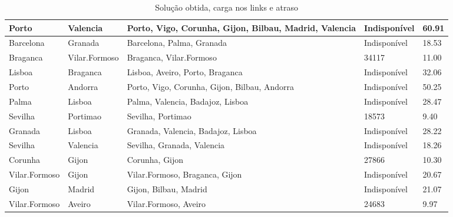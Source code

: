 \begin{table}[!htb]
{\begin{tabular}{|l|l|l|l|l|}
Porto & Valencia & Porto, Vigo, Corunha, Gijon, Bilbau, Madrid, Valencia & Indisponível & 60.91 \\ \hline
Barcelona & Granada & Barcelona, Palma, Granada & Indisponível & 18.53 \\ \hline
Braganca & Vilar.Formoso & Braganca, Vilar.Formoso & 34117 & 11.00 \\ \hline
Lisboa & Braganca & Lisboa, Aveiro, Porto, Braganca & Indisponível & 32.06 \\ \hline
Porto & Andorra & Porto, Vigo, Corunha, Gijon, Bilbau, Andorra & Indisponível & 50.25 \\ \hline
Palma & Lisboa & Palma, Valencia, Badajoz, Lisboa & Indisponível & 28.47 \\ \hline
Sevilha & Portimao & Sevilha, Portimao & 18573 & 9.40 \\ \hline
Granada & Lisboa & Granada, Valencia, Badajoz, Lisboa & Indisponível & 28.22 \\ \hline
Sevilha & Valencia & Sevilha, Granada, Valencia & Indisponível & 18.26 \\ \hline
Corunha & Gijon & Corunha, Gijon & 27866 & 10.30 \\ \hline
Vilar.Formoso & Gijon & Vilar.Formoso, Braganca, Gijon & Indisponível & 20.67 \\ \hline
Gijon & Madrid & Gijon, Bilbau, Madrid & Indisponível & 21.07 \\ \hline
Vilar.Formoso & Aveiro & Vilar.Formoso, Aveiro & 24683 & 9.97 \\ \hline
\end{tabular}}
\caption[]{Solução obtida, carga nos links e atraso}
\end{table}

\begin{table}[!htb]
        \centering
\caption[]{Solução obtida, carga nos links e atraso}
\end{table}

